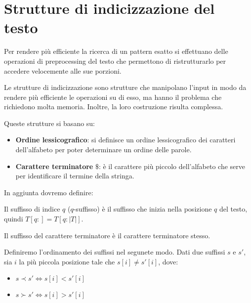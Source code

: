 \section{Strutture di indicizzazione del testo}
Per rendere più efficiente la ricerca di un pattern esatto si effettuano delle
operazioni di preprocessing del testo che permettono di ristrutturarlo per
accedere velocemente alle sue porzioni.

Le strutture di indicizzazione sono strutture che manipolano l'input in modo da
rendere più efficiente le operazioni su di esso, ma hanno il problema che
richiedono molta memoria. Inoltre, la loro costruzione risulta complessa.

Queste strutture si basano su:
\begin{itemize}
    \item \textbf{Ordine lessicografico}: si definisce un ordine lessicografico
          dei caratteri dell'alfabeto per poter determinare un ordine delle
          parole.
    \item \textbf{Carattere terminatore} $\$$: è il carattere più piccolo
          dell'alfabeto che serve per identificare il termine della stringa.
\end{itemize}
In aggiunta dovremo definire:
\begin{definizione}
    Il suffisso di indice $q$ ($q$-suffisso) è il suffisso che inizia nella
    posizione $q$ del testo, quindi $T[q:]= T[q:|T|]$.
\end{definizione}
Il suffisso del carattere terminatore è il carattere terminatore stesso.
\begin{definizione}
    Definiremo l'ordinamento dei suffissi nel segunete modo. Dati due suffissi
    $s$ e $s'$, sia $i$ la più piccola posizione tale che $s[i] \neq s'[i]$, dove:
    \begin{itemize}
        \item $s \prec s'\iff s[i] < s'[i]$
        \item $s \succ s'\iff s[i] > s'[i]$
    \end{itemize}
\end{definizione}
